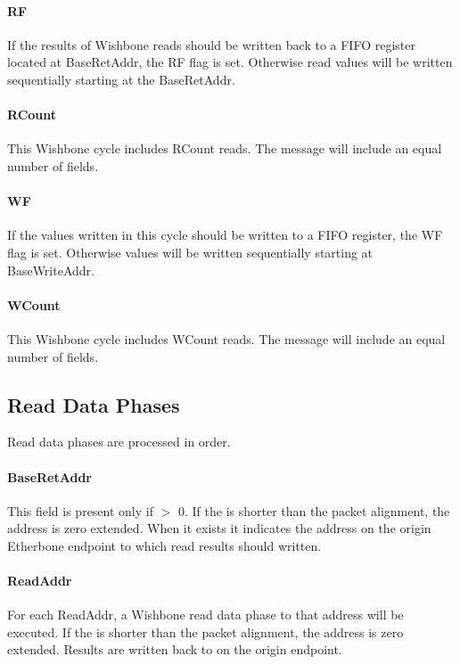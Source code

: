 \documentclass{article}
\begin{document}
\paragraph{RF} \label{field:RF}
If the results of Wishbone reads should be written back to a FIFO register
located at BaseRetAddr, the RF flag is set.
Otherwise read values will be written sequentially starting at the
BaseRetAddr.

\paragraph{RCount} \label{field:RCount}
This Wishbone cycle includes RCount reads.
The message will include an equal number of  fields.

\paragraph{WF} \label{field:WF}
If the values written in this cycle should be written to a FIFO register,
the WF flag is set.
Otherwise values will be written sequentially starting at BaseWriteAddr.

\paragraph{WCount} \label{field:WCount}
This Wishbone cycle includes WCount reads.
The message will include an equal number of  fields.

\subsection{Read Data Phases}

Read data phases are processed in order.

\paragraph{BaseRetAddr} \label{field:BaseRetAddr}
This field is present only if  $>$ 0.
If the  is shorter than the packet alignment, 
the address is zero extended.
When it exists it indicates the address on the origin Etherbone endpoint 
to which read results should written.

\paragraph{ReadAddr} \label{field:ReadAddr}
For each ReadAddr, 
a Wishbone read data phase to that address will be executed.
If the  is shorter than the packet alignment, 
the address is zero extended.
Results are written back to  on the origin endpoint.
\end{document}
